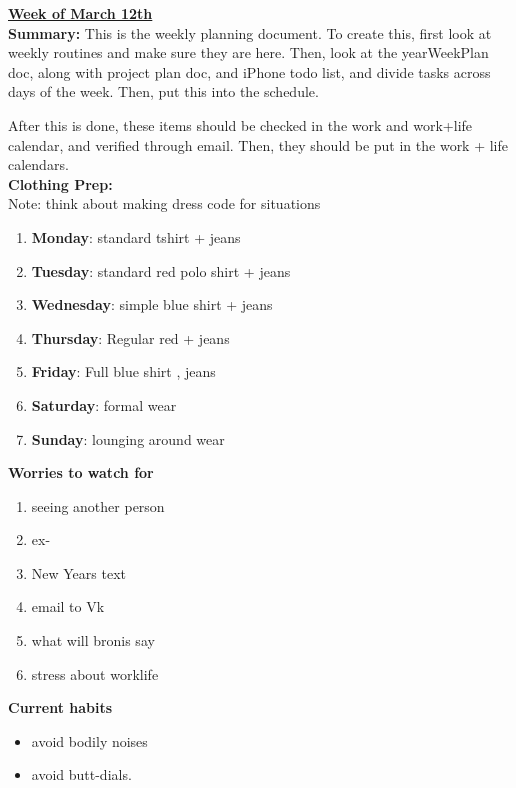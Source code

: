 

{\huge{\underline{\textbf{Week of March 12th}}}} \\

\textbf{Summary:} This is the weekly planning document. To create
this, first look at weekly routines and make sure they are here. Then,
look at the yearWeekPlan doc, along with project plan doc, and iPhone
todo list, and divide tasks across days of the week. Then, put this
into the schedule.

After this is done, these items should be checked in the work and
work+life calendar, and verified through email.
Then, they should be put in the work + life
calendars. \\

\textbf{Clothing Prep: } \\
Note: think about making dress code for situations
\begin{enumerate}
\item \textbf{Monday}: standard tshirt + jeans
\item \textbf{Tuesday}: standard red polo shirt + jeans
\item \textbf{Wednesday}: simple  blue shirt + jeans
\item \textbf{Thursday}: Regular red + jeans
\item \textbf{Friday}: Full blue shirt , jeans
\item \textbf{Saturday}: formal wear
\item \textbf{Sunday}: lounging around wear
\end{enumerate}

\textbf{Worries to watch for} \\
\begin{enumerate}
\item seeing another person
\item ex-
\item New Years text
\item email to Vk
\item what will bronis say
\item stress about worklife
\end{enumerate}

\textbf{Current habits}\\
\begin{itemize}
\item avoid bodily noises
\item avoid butt-dials.
\end{itemize}

